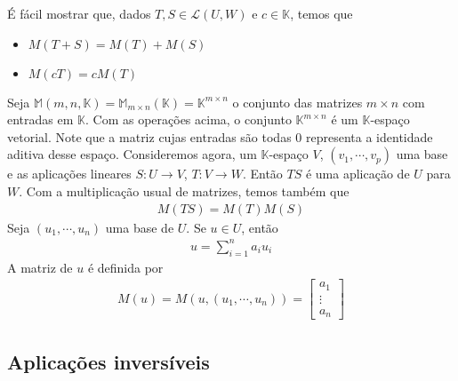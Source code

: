 \documentclass{article}
\newcommand{\K}{\mathbb{K}}
\begin{document}
É fácil mostrar que, dados $T, S \in \mathcal{L}(U,W)$ e $c \in \K$, temos que
\begin{itemize}
    \item $M(T + S) = M(T) + M(S)$
    \item $M(cT) = cM(T)$
\end{itemize}
Seja $\mathbb{M}(m,n,\K) = \mathbb{M}_{m \times n}(\K) = \K^{m \times n}$ o conjunto das matrizes $m \times n$ com entradas em $\K$. Com as operações acima, o conjunto $\K^{m \times n}$ é um $\K$-espaço vetorial. Note que a matriz cujas entradas são todas $0$ representa a identidade aditiva desse espaço. Consideremos agora, um $\K$-espaço $V$, $(v_1,\cdots,v_p)$ uma base e as aplicações lineares $S: U \to V$, $T: V \to W$. Então $TS$ é uma aplicação de $U$ para $W$. Com a multiplicação usual de matrizes, temos também que
\begin{align*}
    M(TS) = M(T)M(S)
\end{align*}
Seja $(u_1,\cdots,u_n)$ uma base de $U$. Se $u \in U$, então
\begin{align*}
    u = \sum_{i=1}^n a_iu_i
\end{align*}
A matriz de $u$ é definida por
\begin{align*}
    M(u) = M(u,(u_1,\cdots,u_n)) = 
    \begin{bmatrix}
        a_1 \\
        \vdots \\
        a_n
    \end{bmatrix}
\end{align*}

\subsection{Aplicações inversíveis}
\end{document}

